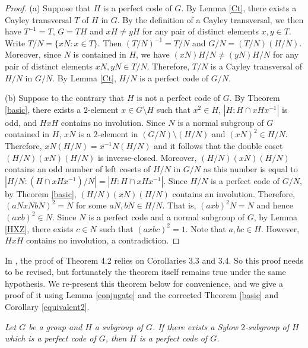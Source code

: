 \documentclass[12pt, a4paper]{article}
\theoremstyle{definition}
\newenvironment{manualtheorem}[1]{%
  \renewcommand\themanualtheoreminner{#1}%
  \manualtheoreminner
}{\endmanualtheoreminner}
\begin{document}
\begin{proof}
(a) Suppose that $H$ is a perfect code of $G$. By Lemma \ref{Ct}, there exists a Cayley transversal $T$ of $H$ in $G$. By the definition of a Cayley transversal, we then have $T^{-1}=T$, $G=TH$ and $xH\neq yH$ for any pair of distinct elements $x,y\in T$. Write $T/N = \{xN: x\in T\}$. Then $(T/N)^{-1}=T/N$ and $G/N=(T/N)(H/N)$. Moreover, since $N$ is contained in $H$, we have $(xN)H/N\neq (yN)H/N$ for any pair of distinct elements $xN,yN \in T/N$. Therefore, $T/N$ is a Cayley transversal of $H/N$ in $G/N$. By Lemma \ref{Ct}, $H/N$ is a perfect code of $G/N$.

(b) Suppose to the contrary that $H$ is not a perfect code of $G$. By Theorem \ref{basic}, there exists a $2$-element $x\in G\setminus H$ such that $x^{2}\in H$, $|H:H\cap xHx^{-1}|$ is odd, and $HxH$ contains no involution. Since $N$ is a normal subgroup of $G$ contained in $H$, $xN$ is a $2$-element in $(G/N)\setminus(H/N)$ and $(xN)^{2}\in H/N$. Therefore, $xN(H/N)=x^{-1}N(H/N)$ and it follows that the double coset $(H/N)(xN)(H/N)$ is inverse-closed.
Moreover, $(H/N)(xN)(H/N)$ contains an odd number of left cosets of $H/N$ in $G/N$ as this number is equal to $|H/N:(H\cap xHx^{-1})/N|=|H:H\cap xHx^{-1}|$. Since $H/N$ is a perfect code of $G/N$, by Theorem \ref{basic}, $(H/N)(xN)(H/N)$ contains an involution. Therefore, $(aNxNbN)^{2}=N$ for some $aN,bN\in H/N$. That is, $(axb)^{2}N=N$ and hence $(axb)^{2}\in N$. Since $N$ is a perfect code and a normal subgroup of $G$, by Lemma \ref{HXZ}, there exists $c\in N$ such that $(axbc)^{2}=1$. Note that $a,bc\in H$. However, $HxH$ contains no involution, a contradiction.
\end{proof}

In \cite{ZZ21}, the proof of Theorem 4.2 relies on Corollaries 3.3 and 3.4. So this proof needs to be revised, but fortunately the theorem itself remains true under the same hypothesis. We re-present this theorem below for convenience, and we give a proof of it using Lemma \ref{conjugate} and the corrected Theorem \ref{basic} and Corollary \ref{equivalent2}.

\begin{manualtheorem}{4.2}
\label{ns}
{\em Let $G$ be a group and $H$ a subgroup of $G$. If there exists a Sylow $2$-subgroup of $H$ which is a perfect code of $G$, then $H$ is a perfect code of $G$.}
\end{manualtheorem}
\end{document}
